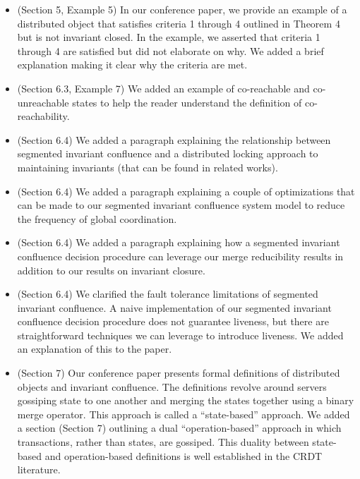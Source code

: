 \documentclass[9pt]{article}
\begin{document}
\begin{multicols*}{2}
\begin{itemize}
  \item (Section 5, Example 5)
    In our conference paper, we provide an example of a distributed object that
    satisfies criteria 1 through 4 outlined in Theorem 4 but is not invariant
    closed. In the example, we asserted that criteria 1 through 4 are satisfied
    but did not elaborate on why. We added a brief explanation making it clear
    why the criteria are met.

  \item (Section 6.3, Example 7)
    We added an example of co-reachable and co-unreachable states to help the
    reader understand the definition of co-reachability.

  \item (Section 6.4)
    We added a paragraph explaining the relationship between segmented
    invariant confluence and a distributed locking approach to maintaining
    invariants (that can be found in related works).

  \item (Section 6.4)
    We added a paragraph explaining a couple of optimizations that can be made
    to our segmented invariant confluence system model to reduce the frequency
    of global coordination.

  \item (Section 6.4)
    We added a paragraph explaining how a segmented invariant confluence
    decision procedure can leverage our merge reducibility results in addition
    to our results on invariant closure.

  \item (Section 6.4)
    We clarified the fault tolerance limitations of segmented invariant
    confluence. A naive implementation of our segmented invariant confluence
    decision procedure does not guarantee liveness, but there are
    straightforward techniques we can leverage to introduce liveness. We added
    an explanation of this to the paper.

  \item (Section 7)
    Our conference paper presents formal definitions of distributed objects and
    invariant confluence. The definitions revolve around servers gossiping
    state to one another and merging the states together using a binary merge
    operator. This approach is called a ``state-based'' approach. We added a
    section (Section 7) outlining a dual ``operation-based'' approach in which
    transactions, rather than states, are gossiped. This duality between
    state-based and operation-based definitions is well established in the CRDT
    literature.
\end{itemize}


\end{multicols*}
\end{document}
